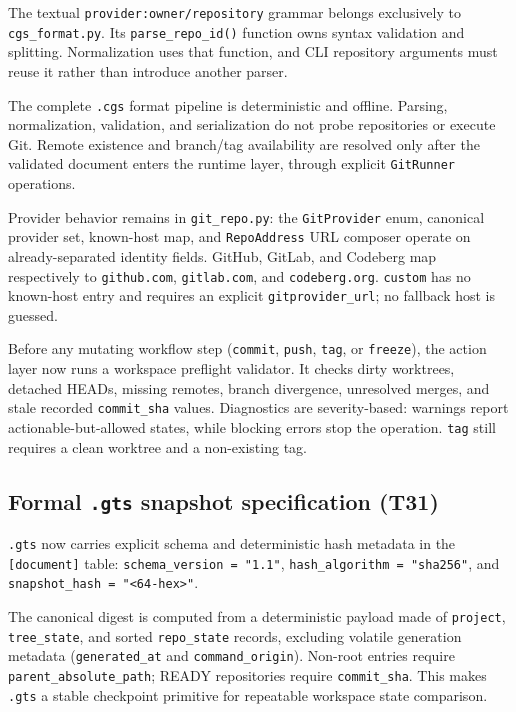 The textual \texttt{provider:owner/repository} grammar belongs exclusively to
\texttt{cgs\_format.py}. Its \texttt{parse\_repo\_id()} function owns syntax validation
and splitting. Normalization uses that function, and CLI repository arguments
must reuse it rather than introduce another parser.

The complete \texttt{.cgs} format pipeline is deterministic and offline.
Parsing, normalization, validation, and serialization do not probe repositories
or execute Git. Remote existence and branch/tag availability are resolved only
after the validated document enters the runtime layer, through explicit
\texttt{GitRunner} operations.

Provider behavior remains in \texttt{git\_repo.py}: the
\texttt{GitProvider} enum, canonical provider set, known-host map, and
\texttt{RepoAddress} URL composer operate on already-separated identity
fields. GitHub, GitLab, and Codeberg map respectively to \texttt{github.com},
\texttt{gitlab.com}, and \texttt{codeberg.org}. \texttt{custom} has no
known-host entry and requires an explicit \texttt{gitprovider\_url}; no
fallback host is guessed.

Before any mutating workflow step (\texttt{commit}, \texttt{push},
\texttt{tag}, or \texttt{freeze}), the action layer now runs a workspace
preflight validator. It checks dirty worktrees, detached HEADs, missing
remotes, branch divergence, unresolved merges, and stale recorded
\texttt{commit\_sha} values. Diagnostics are severity-based:
warnings report actionable-but-allowed states, while blocking errors stop the
operation. \texttt{tag} still requires a clean worktree and a non-existing tag.

\subsection*{Formal \texttt{.gts} snapshot specification (T31)}

\texttt{.gts} now carries explicit schema and deterministic hash metadata in the
\texttt{[document]} table:
\texttt{schema\_version = "1.1"},
\texttt{hash\_algorithm = "sha256"}, and
\texttt{snapshot\_hash = "<64-hex>"}.

The canonical digest is computed from a deterministic payload made of
\texttt{project}, \texttt{tree\_state}, and sorted \texttt{repo\_state} records,
excluding volatile generation metadata (\texttt{generated\_at} and
\texttt{command\_origin}). Non-root entries require
\texttt{parent\_absolute\_path}; READY repositories require \texttt{commit\_sha}.
This makes \texttt{.gts} a stable checkpoint primitive for repeatable workspace
state comparison.

